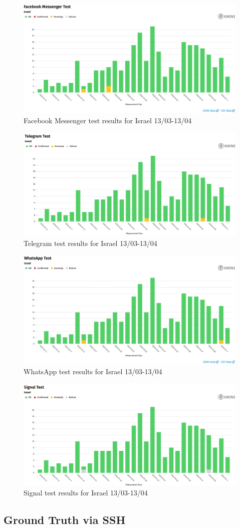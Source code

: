 \begin{figure} [H]
    \centering
    \includegraphics[width=0.5\linewidth]{ISROONIDBFB.png}
    \caption{Facebook Messenger test results for Israel 13/03-13/04}
    \label{fig:enter-label}
\end{figure}
\begin{figure} [H]
    \centering
    \includegraphics[width=0.5\linewidth]{ISROONIDBIM.png}
    \caption{Telegram test results for Israel 13/03-13/04}
    \label{fig:enter-label}
\end{figure}
\begin{figure} [H]
    \centering
    \includegraphics[width=0.5\linewidth]{ISROONIDBTEL.png}
    \caption{WhatsApp test results for Israel 13/03-13/04}
    \label{fig:enter-label}
\end{figure}
\begin{figure} [H]
    \centering
    \includegraphics[width=0.5\linewidth]{ISROONIDBSIG.png}
    \caption{Signal test results for Israel 13/03-13/04}
    \label{fig:enter-label}
\end{figure}


\subsection{Ground Truth via SSH}

